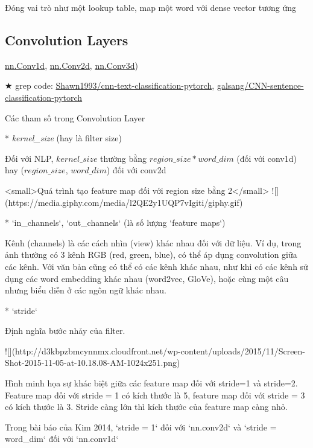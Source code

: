 Đóng vai trò như một lookup table, map một word với dense vector tương ứng

\subsection{Convolution Layers}


\href{http://pytorch.org/docs/master/nn.html#conv1d}{nn.Conv1d}, \href{http://pytorch.org/docs/master/nn.html#conv2d}{nn.Conv2d}, \href{http://pytorch.org/docs/master/nn.html#conv3d}{nn.Conv3d})

★ grep code: \href{https://github.com/Shawn1993/cnn-text-classification-pytorch/blob/master/model.py#L20-L24}{Shawn1993/cnn-text-classification-pytorch}, \href{https://github.com/galsang/CNN-sentence-classification-pytorch/blob/master/model.py#L36-L38}{galsang/CNN-sentence-classification-pytorch}

Các tham số trong Convolution Layer

* \textit{kernel\_size} (hay là filter size)

Đối với NLP, $kernel\_size$ thường bằng $region\_size * word\_dim$ (đối với conv1d) hay ($region\_size$, $word\_dim$) đối với conv2d

<small>Quá trình tạo feature map đối với region size bằng 2</small>
![](https://media.giphy.com/media/l2QE2y1UQP7vIgiti/giphy.gif)

* `in_channels`, `out_channels` (là số lượng `feature maps`)

Kênh (channels) là các cách nhìn (view) khác nhau đối với dữ liệu. Ví dụ, trong ảnh thường có 3 kênh RGB (red, green, blue), có thể áp dụng convolution giữa các kênh. Với văn bản cũng có thể có các kênh khác nhau, như khi có các kênh sử dụng các word embedding khác nhau (word2vec, GloVe), hoặc cùng một câu nhưng biểu diễn ở các ngôn ngữ khác nhau.

* `stride`

Định nghĩa bước nhảy của filter.

![](http://d3kbpzbmcynnmx.cloudfront.net/wp-content/uploads/2015/11/Screen-Shot-2015-11-05-at-10.18.08-AM-1024x251.png)

Hình minh họa sự khác biệt giữa các feature map đối với stride=1 và stride=2. Feature map đối với stride = 1 có kích thước là 5, feature map đối với stride = 3 có kích thước là 3. Stride càng lớn thì kích thước của feature map càng nhỏ.

Trong bài báo của Kim 2014, `stride = 1` đối với `nn.conv2d` và `stride = word_dim` đối với `nn.conv1d`

